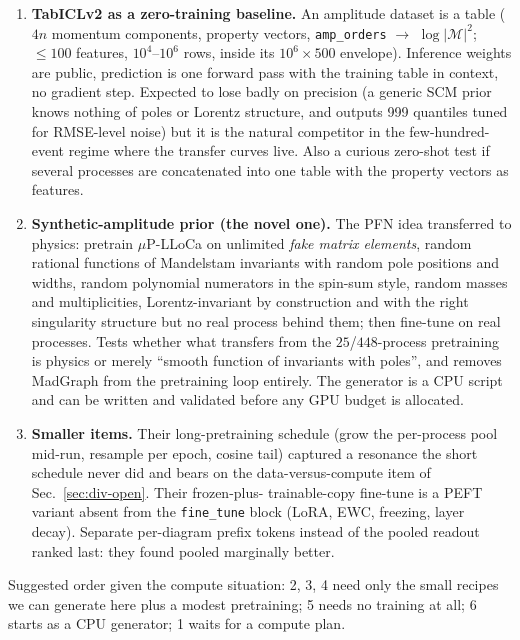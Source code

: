\documentclass[11pt]{article}
\newcommand{\code}[1]{\texttt{#1}}
\begin{document}
\begin{enumerate}
    degeneracy, $e/\mu$ universality, Higgs self-coupling, quartic gauge topologies, $\tau$
    Yukawa. Gives a map of which structure transfers instead of one number. Recipe design is
    CPU-only and can be done now; evaluation needs a pretrained model. Sharpest sub-case: their
    embeddings transferred PDF-driven shape but not the matrix-element-driven threshold; for us
    the matrix element \emph{is} the target, so novel-vertex hold-outs are the decisive test.
  \item \textbf{TabICLv2 as a zero-training baseline.} An amplitude dataset is a table
    ($4n$ momentum components, property vectors, \code{amp\_orders} $\to$ $\log|\mathcal{M}|^2$;
    ${\le}100$ features, $10^4$--$10^6$ rows, inside its $10^6\times500$ envelope). Inference
    weights are public, prediction is one forward pass with the training table in context, no
    gradient step. Expected to lose badly on precision (a generic SCM prior knows nothing of
    poles or Lorentz structure, and outputs 999 quantiles tuned for RMSE-level noise) but it is
    the natural competitor in the few-hundred-event regime where the transfer curves live.
    Also a curious zero-shot test if several processes are concatenated into one table with
    the property vectors as features.
  \item \textbf{Synthetic-amplitude prior (the novel one).} The PFN idea transferred to
    physics: pretrain $\mu$P-LLoCa on unlimited \emph{fake matrix elements}, random rational
    functions of Mandelstam invariants with random pole positions and widths, random polynomial
    numerators in the spin-sum style, random masses and multiplicities, Lorentz-invariant by
    construction and with the right singularity structure but no real process behind them; then
    fine-tune on real processes. Tests whether what transfers from the $25$/$448$-process
    pretraining is physics or merely ``smooth function of invariants with poles'', and removes
    MadGraph from the pretraining loop entirely. The generator is a CPU script and can be
    written and validated before any GPU budget is allocated.
  \item \textbf{Smaller items.} Their long-pretraining schedule (grow the per-process pool
    mid-run, resample per epoch, cosine tail) captured a resonance the short schedule never did
    and bears on the data-versus-compute item of Sec.~\ref{sec:div-open}. Their frozen-plus-
    trainable-copy fine-tune is a PEFT variant absent from the \code{fine\_tune} block (LoRA,
    EWC, freezing, layer decay). Separate per-diagram prefix tokens instead of the pooled
    readout ranked last: they found pooled marginally better.
\end{enumerate}
Suggested order given the compute situation: 2, 3, 4 need only the small recipes we can
generate here plus a modest pretraining; 5 needs no training at all; 6 starts as a CPU
generator; 1 waits for a compute plan.
\end{document}
